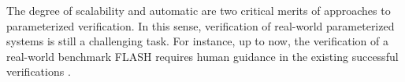 \documentclass[final]{IEEEtran}
\begin{document}
The degree of scalability and automatic are two critical merits of approaches to parameterized verification. In this sense, verification of real-world parameterized systems is still a challenging task.
For instance, up to now, the verification of a real-world benchmark FLASH requires human guidance in the existing successful verifications \cite{Park1996a,McMillan2001,Chou2004}. %
\end{document}

